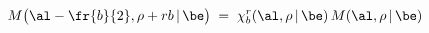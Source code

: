 \begin{equation}\label{funeqs}
M\big(\al-\fr{b}{2},\rho+rb\,|\,\be\big)\;=\;
\chi^{r}_{b}(\al,\rho\,|\,\be)\,
M(\al,\rho\,|\,\be)
\end{equation}

